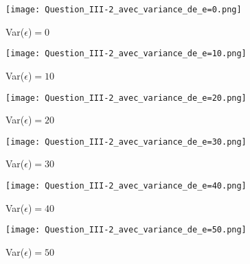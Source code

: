 \documentclass[paper=a4, fontsize=11pt]{scrartcl} %
\numberwithin{equation}{section} %
\numberwithin{figure}{section} %
\numberwithin{table}{section} %
\begin{document}
\begin{figure}[!htb]
  \texttt{[image: Question\_III-2\_avec\_variance\_de\_e=0.png]}
  \caption{Var($\epsilon$)$=0$}\label{fig:3-2_var_e_0}
\endminipage\hfill
{}
  \texttt{[image: Question\_III-2\_avec\_variance\_de\_e=10.png]}
  \caption{Var($\epsilon$)$=10$}\label{fig:3-2_var_e_10}
\endminipage\hfill
{}
  \texttt{[image: Question\_III-2\_avec\_variance\_de\_e=20.png]}
  \caption{Var($\epsilon$)$=20$}\label{fig:3-2_var_e_20}
\endminipage
\end{figure}
\begin{figure}[!htb]
  \texttt{[image: Question\_III-2\_avec\_variance\_de\_e=30.png]}
  \caption{Var($\epsilon$)$=30$}\label{fig:3-2_var_e_30}
\endminipage\hfill
{}
  \texttt{[image: Question\_III-2\_avec\_variance\_de\_e=40.png]}
  \caption{Var($\epsilon$)$=40$}\label{fig:3-2_var_e_40}
\endminipage\hfill
{}
  \texttt{[image: Question\_III-2\_avec\_variance\_de\_e=50.png]}
  \caption{Var($\epsilon$)$=50$}\label{fig:3-2_var_e_50}
\endminipage
\end{figure}


\iffalse 
\begin{figure}[!htb]
\minipage{0.5\textwidth}
  \texttt{[image: Question\_III-2\_avec\_variance\_de\_e=0.png]}
  \caption{Var($\epsilon$)$=0$}\label{fig:3-2_var_e_0}
\endminipage
\minipage{0.5\textwidth}
  \texttt{[image: Question\_III-2\_avec\_variance\_de\_e=10.png]}
  \caption{Var($\epsilon$)$=10$}\label{fig:3-2_var_e_10}
\endminipage
\end{figure}
\begin{figure}[!htb]
\minipage{0.5\textwidth}
  \texttt{[image: Question\_III-2\_avec\_variance\_de\_e=20.png]}
  \caption{Var($\epsilon$)$=20$}\label{fig:3-2_var_e_20}
\endminipage\hfill
\minipage{0.5\textwidth}
  \texttt{[image: Question\_III-2\_avec\_variance\_de\_e=30.png]}
  \caption{Var($\epsilon$)$=30$}\label{fig:3-2_var_e_30}
\endminipage
\end{figure}
\begin{figure}[!htb]
\minipage{0.5\textwidth}
  \texttt{[image: Question\_III-2\_avec\_variance\_de\_e=40.png]}
  \caption{Var($\epsilon$)$=40$}\label{fig:3-2_var_e_40}
\endminipage\hfill
\minipage{0.5\textwidth}
  \texttt{[image: Question\_III-2\_avec\_variance\_de\_e=50.png]}
  \caption{Var($\epsilon$)$=50$}\label{fig:3-2_var_e_50}
\endminipage
\end{figure}
\fi
\end{document}
